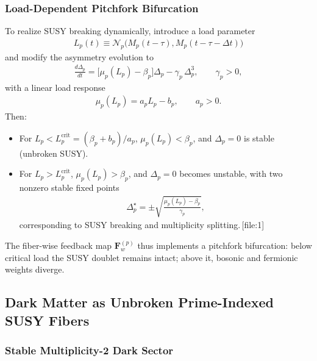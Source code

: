 \documentclass[11pt]{article}
\begin{document}
\subsubsection{Load-Dependent Pitchfork Bifurcation}

To realize SUSY breaking dynamically, introduce a load parameter
\begin{align}
L_p(t)\equiv \mathcal{N}_p\bigl(M_p(t-\tau),M_p(t-\tau-\Delta t)\bigr)
\end{align}
and modify the asymmetry evolution to
\begin{align}
\frac{d\Delta_p}{dt}
=
\bigl[\mu_p(L_p)-\beta_p\bigr]\Delta_p - \gamma_p\,\Delta_p^3,
\qquad \gamma_p>0,
\end{align}
with a linear load response
\begin{align}
\mu_p(L_p) = a_p L_p - b_p,\qquad a_p>0.
\end{align}
Then:
\begin{itemize}
  \item For \(L_p < L_p^{\mathrm{crit}}=(\beta_p+b_p)/a_p\), \(\mu_p(L_p)<\beta_p\), and \(\Delta_p=0\) is stable (unbroken SUSY).
  \item For \(L_p > L_p^{\mathrm{crit}}\), \(\mu_p(L_p)>\beta_p\), and \(\Delta_p=0\) becomes unstable, with two nonzero stable fixed points
  \begin{align}
  \Delta_p^\star = \pm \sqrt{\frac{\mu_p(L_p)-\beta_p}{\gamma_p}},
  \end{align}
  corresponding to SUSY breaking and multiplicity splitting.\,[file:1]
\end{itemize}
The fiber-wise feedback map \(\mathbf{F}_w^{(p)}\) thus implements a pitchfork bifurcation: below critical load the SUSY doublet remains intact; above it, bosonic and fermionic weights diverge.

\subsection{Dark Matter as Unbroken Prime-Indexed SUSY Fibers}

\subsubsection{Stable Multiplicity-2 Dark Sector}
\end{document}
